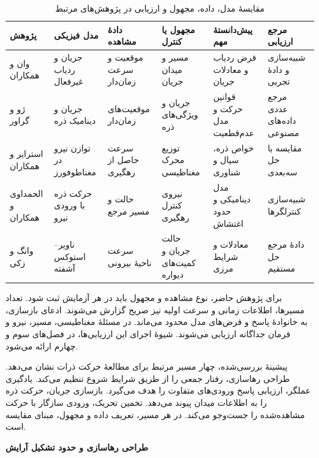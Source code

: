 \begin{table}[p]
\centering
\small
\caption{مقایسهٔ مدل، داده، مجهول و ارزیابی در پژوهش‌های مرتبط}
\label{tab:lit-inverse-information-comparison}
\setlength{\tabcolsep}{3pt}
\begin{tabular}{p{}p{}p{}p{}p{}p{}}
\hline
پژوهش & مدل فیزیکی & دادهٔ مشاهده & مجهول یا کنترل & پیش‌دانستهٔ مهم & مرجع ارزیابی \\
\hline
وان و همکاران \cite{Wan2026TrajectoryFlowNet}
& جریان و ردیاب غیرفعال
& موقعیت و سرعت زمان‌دار
& مسیر و میدان جریان
& فرض ردیاب و معادلات جریان
& شبیه‌سازی و دادهٔ تجربی \\
ژو و گراور \cite{ZhouGrauer2026Joint}
& جریان و دینامیک ذره
& موقعیت‌های زمان‌دار
& جریان و ویژگی‌های ذره
& قوانین حرکت و مدل عدم‌قطعیت
& مرجع عددی داده‌های مصنوعی \\
استرایر و همکاران \cite{Strayer2024ForceMapping}
& توازن نیرو در مغناطوفورز
& سرعت حاصل از رهگیری
& توزیع محرک مغناطیسی
& خواص ذره، سیال و شناوری
& مقایسه با حل سه‌بعدی \\
الحمداوی و همکاران \cite{ElHamdaoui2026Tracking}
& حرکت ذره با ورودی نیرو
& حالت و مسیر مرجع
& نیروی کنترل رهگیری
& مدل دینامیکی و حدود اغتشاش
& شبیه‌سازی کنترلگرها \\
وانگ و زکی \cite{WangZaki2025OuterObservations}
& ناویر–استوکس آشفته
& سرعت ناحیهٔ بیرونی
& حالت جریان و کمیت‌های دیواره
& معادلات و شرایط مرزی
& دادهٔ مرجع حل مستقیم \\
\hline
\end{tabular}
\end{table}

برای پژوهش حاضر، نوع مشاهده و مجهول باید در هر آزمایش ثبت شود.
تعداد مسیرها، اطلاعات زمانی و سرعت اولیه نیز صریح گزارش می‌شوند.
ادعای بازسازی، به خانوادهٔ پاسخ و فرض‌های مدل محدود می‌ماند.
در مسئلهٔ مغناطیسی، مسیر، نیرو و فرمان جداگانه ارزیابی می‌شوند.
شیوهٔ اجرای این ارزیابی‌ها، در فصل‌های سوم و چهارم ارائه می‌شود.

\label{sec:lit-review-synthesis}

پیشینهٔ بررسی‌شده، چهار مسیر مرتبط برای مطالعهٔ حرکت ذرات نشان می‌دهد.
طراحی رهاسازی، رفتار جمعی را از طریق شرایط شروع تنظیم می‌کند.
یادگیری عملگر، ارزیابی پاسخ ورودی‌های متفاوت را هدف می‌گیرد.
بازسازی جریان، حرکت ذره را به اطلاعات میدان پیوند می‌دهد.
تخمین تحریک، ورودی سازگار با حرکت مشاهده‌شده را جست‌وجو می‌کند.
در هر مسیر، تعریف داده و مجهول، مبنای مقایسه است.

\textbf{طراحی رهاسازی و حدود تشکیل آرایش}

